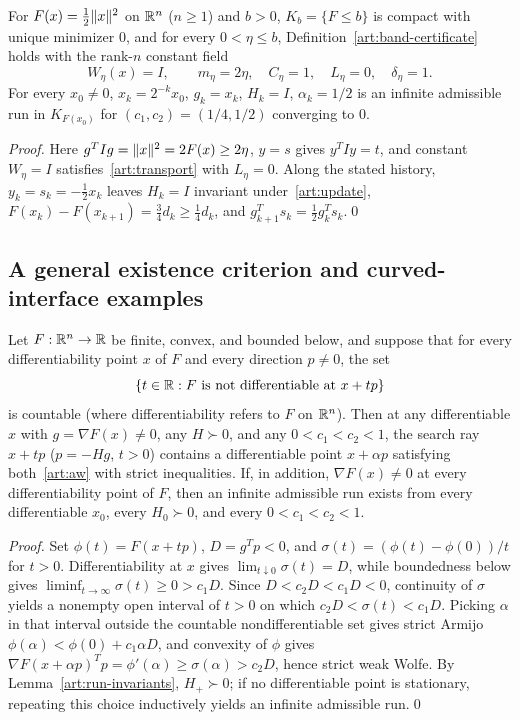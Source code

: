 \begin{proposition}\label{art:examples-full-rank}
For $F(x)=\tfrac12\lVert x\rVert^2$ on $\mathbb R^n$ ($n\ge1$) and $b>0$, $K_b=\{F\le b\}$ is
compact with unique minimizer $0$, and for every $0<\eta\le b$,
Definition~\ref{art:band-certificate} holds with the rank-$n$ constant field
\[
 W_\eta(x)=I,\qquad m_\eta=2\eta,\quad C_\eta=1,
 \quad L_\eta=0,\quad\delta_\eta=1.
\]
For every $x_0\ne0$, $x_k=2^{-k}x_0$, $g_k=x_k$, $H_k=I$, $\alpha_k=1/2$ is an
infinite admissible run in $K_{F(x_0)}$ for $(c_1,c_2)=(1/4,1/2)$ converging to
$0$.
\end{proposition}
\begin{proof}
Here $g^TIg=\lVert x\rVert^2=2F(x)\ge2\eta$, $y=s$ gives $y^TIy=t$, and constant
$W_\eta=I$ satisfies~\eqref{art:transport} with $L_\eta=0$. Along the stated
history, $y_k=s_k=-\tfrac12x_k$ leaves $H_k=I$ invariant under~\eqref{art:update},
$F(x_k)-F(x_{k+1})=\tfrac34d_k\ge\tfrac14d_k$, and $g_{k+1}^Ts_k=\tfrac12g_k^Ts_k$.\qed
\end{proof}

\subsection{A general existence criterion and curved-interface examples}

\begin{lemma}\label{art:examples-run-existence}
Let $F:\mathbb R^n\to\mathbb R$ be finite, convex, and bounded below, and suppose that for
every differentiability point $x$ of $F$ and every direction $p\ne0$, the set
\[
 \{t\in\mathbb R:F\text{ is not differentiable at }x+tp\}
\]
is countable (where differentiability refers to $F$ on $\mathbb R^n$). Then at any
differentiable $x$ with $g=\nabla F(x)\ne0$, any $H\succ0$, and any
$0<c_1<c_2<1$, the search ray $x+tp$ ($p=-Hg$, $t>0$) contains a differentiable
point $x+\alpha p$ satisfying both~\eqref{art:aw} with strict inequalities. If,
in addition, $\nabla F(x)\ne0$ at every differentiability point of $F$, then an
infinite admissible run exists from every differentiable $x_0$, every
$H_0\succ0$, and every $0<c_1<c_2<1$.
\end{lemma}
\begin{proof}
Set $\phi(t)=F(x+tp)$, $D=g^Tp<0$, and $\sigma(t)=(\phi(t)-\phi(0))/t$ for
$t>0$. Differentiability at $x$ gives $\lim_{t\downarrow0}\sigma(t)=D$, while
boundedness below gives $\liminf_{t\to\infty}\sigma(t)\ge0>c_1D$. Since
$D<c_2D<c_1D<0$, continuity of $\sigma$ yields a nonempty open interval of
$t>0$ on which $c_2D<\sigma(t)<c_1D$. Picking $\alpha$ in that interval outside
the countable nondifferentiable set gives strict Armijo $\phi(\alpha)<\phi(0)+c_1\alpha D$,
and convexity of $\phi$ gives $\nabla F(x+\alpha p)^Tp=\phi'(\alpha)\ge\sigma(\alpha)>c_2D$,
hence strict weak Wolfe. By Lemma~\ref{art:run-invariants}, $H_+\succ0$; if no
differentiable point is stationary, repeating this choice inductively yields an
infinite admissible run.\qed
\end{proof}

